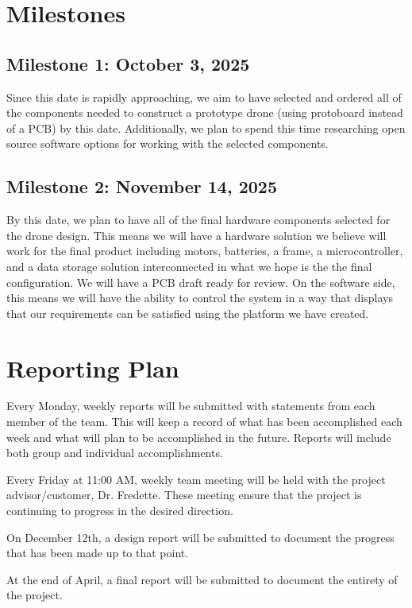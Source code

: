 \documentclass[12pt, titlepage]{article}
\begin{document}
\section{Milestones}

\subsection[October 3, 2025]{Milestone 1: October 3, 2025} Since this date is rapidly approaching, we aim to have selected and ordered all of the components needed to construct a prototype drone (using protoboard instead of a PCB) by this date. Additionally, we plan to spend this time researching open source software options for working with the selected components. \\

\subsection[November 14, 2025]{Milestone 2: November 14, 2025} By this date, we plan to have all of the final hardware components selected for the drone design. This means we will have a hardware solution we believe will work for the final product including motors, batteries, a frame, a microcontroller, and a data storage solution interconnected in what we hope is the the final configuration. We will have a PCB draft ready for review. On the software side, this means we will have the ability to control the system in a way that displays that our requirements can be satisfied using the platform we have created.

\section{Reporting Plan}
Every Monday, weekly reports will be submitted with statements from each member of the team. This will keep a record of what has been accomplished each week and what will plan to be accomplished in the future. Reports will include both group and individual accomplishments.
  
Every Friday at 11:00 AM, weekly team meeting will be held with the project advisor/customer, Dr. Fredette. These meeting ensure that the project is continuing to progress in the desired direction.
  
On December 12th, a design report will be submitted to document the progress that has been made up to that point.
  
At the end of April, a final report will be submitted to document the entirety of the project.
\end{document}
